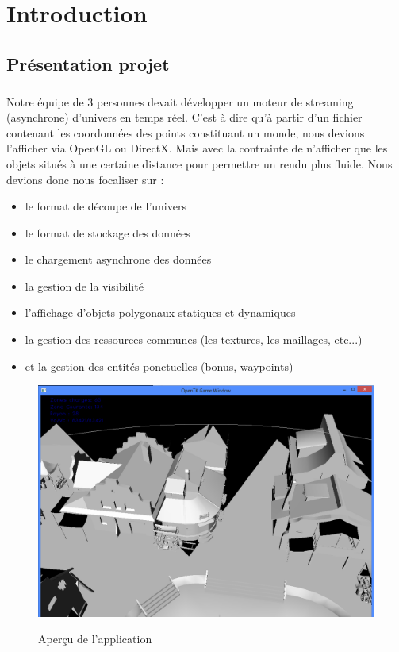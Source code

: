 \documentclass{report}
\begin{document}
	\chapter{Introduction}
		\section{Présentation projet}
	
		\paragraph{}Notre équipe de 3 personnes devait développer un moteur de streaming (asynchrone) d'univers en temps réel. C'est à dire qu'à partir d'un fichier contenant les coordonnées des points constituant un monde, nous devions l'afficher via OpenGL ou DirectX. 
Mais avec la contrainte de n'afficher que les objets situés à une certaine distance pour permettre un rendu plus fluide. Nous devions donc nous focaliser sur :
\begin{itemize}
	\item le format de découpe de l'univers 
	\item le format de stockage des données 
	\item le chargement asynchrone des données 
	\item la gestion de la visibilité
	\item l'affichage d'objets polygonaux statiques et dynamiques
	\item la gestion des ressources communes (les textures, les maillages, etc...)
	\item et la gestion des entités ponctuelles (bonus, waypoints)
\end{itemize}

		\begin{figure}[!h]
			\centering
			\includegraphics[scale=0.3]{images/capture1.png}\\
			\caption{Aperçu de l'application}
			\label{Aperçu de l'application}
		\end{figure}
\end{document}
